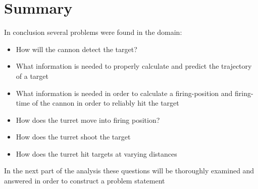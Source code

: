 \section{Summary}
In conclusion several problems were found in the domain:
\begin{itemize}
	\item How will the cannon detect the target?
	\item What information is needed to properly calculate and predict the trajectory of a target
	\item What information is needed in order to calculate a firing-position and firing-time of the cannon in order to reliably hit the target
	\item How does the turret move into firing position?
	\item How does the turret shoot the target
	\item How does the turret hit targets at varying distances
\end{itemize}
In the next part of the analysis these questions will be thoroughly examined and answered in order to construct a problem statement
